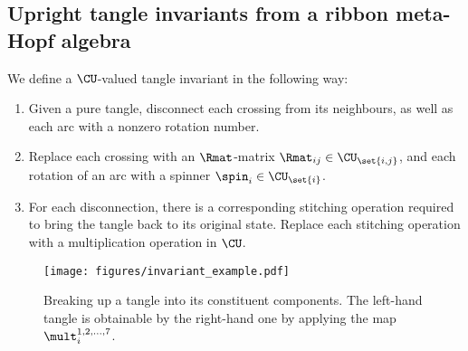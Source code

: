 \subsection{Upright tangle invariants from a ribbon meta-Hopf algebra}
We define a $\CU$-valued tangle invariant in the following way:
\begin{enumerate}
        \item Given a pure tangle, disconnect each crossing from its neighbours,
                as well as each arc with a nonzero rotation number.
        \item Replace each crossing with an $\Rmat$-matrix
                $\Rmat_{ij}\in\CU_{\set{i,j}}$, and each rotation of an arc with
                a spinner $\spin_i\in \CU_{\set{i}}$.
        \item For each disconnection, there is a corresponding stitching
                operation required to bring the tangle back to its original
                state. Replace each stitching operation with a multiplication
                operation in $\CU$.
\end{enumerate}

\begin{figure}[h]
        \centering
        \texttt{[image: figures/invariant\_example.pdf]}
        \caption{Breaking up a tangle into its constituent components. The
        left-hand tangle is obtainable by the right-hand one by applying the map
        $\mult^{1,2,\dots,7}_{i}$.}
        \label{fig:invariant_example}
\end{figure}
